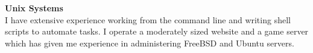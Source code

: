 \textbf{Unix Systems} \\
I have extensive experience working from the command line and writing shell
scripts to automate tasks. I operate a moderately sized website and a game
server which has given me experience in administering FreeBSD and Ubuntu
servers.

